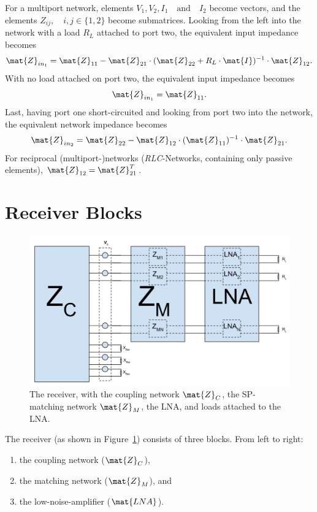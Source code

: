 For a multiport network, elements $V_1,V_2,I_1\quad\text{and}\quad I_2$ become vectors, and the elements $Z_{ij},\quad i,j\in\{1,2\}$ become submatrices.
Looking from the left into the network with a load $R_L$ attached to port two, the equivalent input impedance becomes
\begin{equation}
\label{eq:eq_imp_load}
\mat{Z}_{in_1} = \mat{Z}_{11} - \mat{Z}_{21}\cdot(\mat{Z}_{22} + R_L\cdot\mat{I})^{-1}\cdot \mat{Z}_{12}.
\end{equation}
With no load attached on port two, the equivalent input impedance becomes
\begin{equation}
\label{eq:eq_imp_oc}
\mat{Z}_{in_1} = \mat{Z}_{11}.
\end{equation}
Last, having port one short-circuited and looking from port two into the network, the equivalent network impedance becomes
\begin{equation}
\label{eq:eq_imp_sc}
\mat{Z}_{in_2} = \mat{Z}_{22} - \mat{Z}_{12}\cdot(\mat{Z}_{11})^{-1}\cdot \mat{Z}_{21}.
\end{equation}
For reciprocal (multiport-)networks (\textit{RLC}-Networks, containing only passive elements), $\mat{Z}_{12} = \mat{Z}_{21}^T$.

\section{Receiver Blocks}
\begin{figure}
\centering
  \includegraphics[width=\linewidth]{images/Receiver.png}
\caption{The receiver, with the coupling network $\mat{Z}_C$, the SP-matching network $\mat{Z}_M$, the LNA, and loads attached to the LNA.}
\label{fig:receiver}
\end{figure}
The receiver (as shown in Figure~\ref{fig:receiver}) consists of three blocks.
From left to right:
\begin{enumerate}
\item{the coupling network ($\mat{Z}_C$),}
\item{the matching network ($\mat{Z}_M$), and}
\item{the low-noise-amplifier ($\mat{LNA}$).}
\end{enumerate}
 
